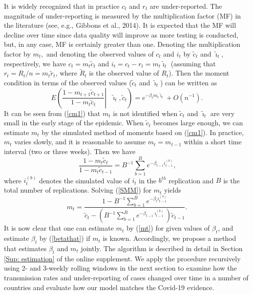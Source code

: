 \documentclass[12pt]{article}
\begin{document}
It is widely recognized that in practice $c_{t}$ and $r_{t}$ are
under-reported. The magnitude of under-reporting is measured by the
multiplication factor (MF) in the literature (see, e.g., Gibbons et al.,
2014). It is expected that the MF will decline over time since data quality
will improve as more testing is conducted, but, in any case, MF is certainly
greater than one. Denoting the multiplication factor by $m_{t},$ and denoting
the observed values of $c_{t}$ and $i_{t}$ by $\tilde{c}_{t}$ and
$\tilde{\imath}_{t}$, respectively, we have $c_{t}=m_{t}\tilde{c}_{t}$ and
$i_{t}=c_{t}-r_{t}=m_{t}\tilde{\imath}_{t}$ (assuming that $r_{t}%
=R_{t}/n=m_{t}\tilde{r}_{t}$, where $\tilde{R}_{t}$ is the observed value of
$R_{t}$). Then the moment condition in terms of the observed values
($\tilde{c}_{t}$ and $\tilde{\imath}_{t}$) can be written as%
\begin{equation}
E\left(  \left.  \frac{1-m_{t+1}\tilde{c}_{t+1}}{1-m_{t}\tilde{c}_{t}%
}\right\vert \text{ }\tilde{\imath}_{t},\tilde{c}_{t}\right)  =e^{-\beta
_{t}m_{t}\tilde{\imath}_{t}}+O\left(  n^{-1}\right)  . \label{cm1}%
\end{equation}
It can be seen from (\ref{cm1}) that $m_{t}$ is not identified when $\tilde
{c}_{t}$ and $\tilde{\imath}_{t}$ are very small in the early stage of the
epidemic. When $\tilde{c}_{t}$ becomes large enough, we can estimate $m_{t}$
by the simulated method of moments based on (\ref{cm1}). In practice, $m_{t}$
varies slowly, and it is reasonable to assume $m_{t}=m_{t-1}$ within a short
time interval (two or three weeks). Then we have%
\begin{equation}
\frac{1-m_{t}\tilde{c}_{t}}{1-m_{t}\tilde{c}_{t-1}}=B^{-1}\sum_{b=1}%
^{B}e^{-\beta_{t-1}i_{t-1}^{\left(  b\right)  }}\text{,} \label{SMM}%
\end{equation}
where $i_{t}^{\left(  b\right)  }$ denotes the simulated value of $i_{t}$ in
the $b^{th}$ replication and $B$ is the total number of replications. Solving
(\ref{SMM}) for $m_{t}$ yields%
\begin{equation}
m_{t}=\frac{1-B^{-1}\sum_{b=1}^{B}e^{-\beta_{t}i_{t-1}^{\left(  b\right)  }}%
}{\tilde{c}_{t}-\left(  B^{-1}\sum_{b=1}^{B}e^{-\beta_{t-1}\imath
_{t-1}^{\left(  b\right)  }}\right)  \tilde{c}_{t-1}}. \label{mt}%
\end{equation}
It is now clear that one can estimate $m_{t}$ by (\ref{mt}) for given values
of $\beta_{t}$, and estimate $\beta_{t}$ by (\ref{betathat}) if $m_{t}$ is
known. Accordingly, we propose a method that estimates $\beta_{t}$ and $m_{t}$
jointly. The algorithm is described in detail in Section \ref{Sup: estimation}
of the online supplement. We apply the procedure recursively using 2- and
3-weekly rolling windows in the next section to examine how the transmission
rates and under-reporting of cases changed over time in a number of countries
and evaluate how our model matches the Covid-19 evidence.
\end{document}
